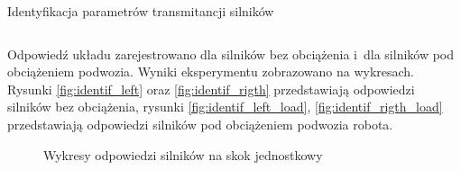 \documentclass[11pt]{article}
\begin{document}
\begin{listing}[htb]
\caption{Identyfikacja parametrów transmitancji silników}
\inputminted[firstline=34, lastline=55, frame=lines, linenos, breaklines]{matlab}{../Identification/Identification.m}
\label{lst:mot_identif}
\end{listing}
 
Odpowiedź układu zarejestrowano dla silników bez obciążenia i~dla silników pod obciążeniem podwozia.
Wyniki eksperymentu zobrazowano na wykresach. Rysunki \ref{fig:identif_left} oraz \ref{fig:identif_rigth} przedstawiają odpowiedzi silników bez obciążenia, rysunki \ref{fig:identif_left_load}, \ref{fig:identif_rigth_load} przedstawiają odpowiedzi silników pod obciążeniem podwozia robota.

\begin{figure}[!htbp] 
	\quad 
	\caption{Wykresy odpowiedzi silników na skok jednostkowy} 
\end{figure}
\end{document}
